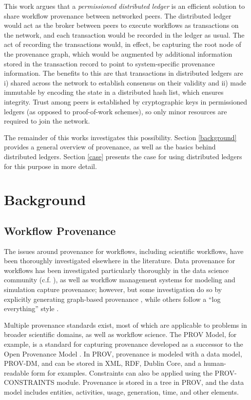 This work argues that a \textit{permissioned distributed ledger} is an efficient
solution to share workflow provenance between networked peers. The distributed
ledger would act as the broker between peers to execute workflows as
transactions on the network, and each transaction would be recorded in the
ledger as usual. The act of recording the transactions would, in effect, be
capturing the root node of the provenance graph, which would be augmented by
additional information stored in the transaction record to point to
system-specific provenance information. The benefits to this are that
transactions in distributed ledgers are i) shared across the network to
establish consensus on their validity and ii) made immutable by encoding the
state in a distributed hash list, which ensures integrity. Trust among peers is
established by cryptographic keys in permissioned ledgers (as opposed to
proof-of-work schemes), so only minor resources are required to join the
network.

The remainder of this works investigates this possibility. Section
\ref{background} provides a general overview of provenance, as well as the
basics behind distributed ledgers. Section \ref{case} presents the case for using
distributed ledgers for this purpose in more detail.

\section{Background}
\label{provenance-background}

\subsection{Workflow Provenance}
The issues around provenance for workflows, including scientific workflows, have
been thoroughly investigated elsewhere in the literature. Data provenance for
workflows has been investigated particularly thoroughly in the data science
community (c.f. \cite{davidson_provenance_2007}), as well as workflow management
systems for modeling and simulation capture provenance; however, but some
investigation do so by explicitly generating graph-based provenance
\cite{pizzi_aiida:_2016}, while others follow a ``log everything'' style
\cite{billings_eclipse_2017}.

Multiple provenance standards exist, most of which are applicable to problems in
broader scientific domains, as well as workflow science. The PROV Model, for
example, is a standard for capturing provenance developed as a successor to the
Open Provenance Model \cite{noauthor_prov-overview_nodate}
\cite{moreau_open_2011}. In PROV, provenance is modeled with a data model,
PROV-DM, and can be stored in XML, RDF, Dublin Core, and a human-readable form
for examples. Constraints can also be applied using the PROV-CONSTRAINTS module.
Provenance is stored in a tree in PROV, and the data model includes entities,
activities, usage, generation, time, and other elements.

